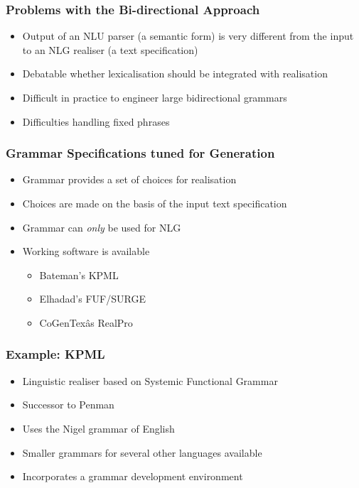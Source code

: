 \documentclass[compress,color=usenames]{beamer}
\begin{document}
\begin{frame}
\frametitle{
Problems with the 
Bi-directional Approach}

\label{f33}
\begin{itemize}
\item {{Output of an NLU parser (a semantic form) is very different from the input to an NLG realiser (a text specification)}}
\item {{Debatable whether lexicalisation should be integrated with realisation}}
\item {{Difficult in practice to engineer large bidirectional grammars}}
\item {{Difficulties handling fixed phrases}}
\end{itemize}

\end{frame}

\begin{frame}
\frametitle{
Grammar Specifications tuned for Generation}

\label{f35}
\begin{itemize}
\item {{Grammar provides a set of choices for realisation}}
\item {{Choices are made on the basis of the input text specification}}
\item {{Grammar can \textit{only} be used for NLG}}
\item {{Working software is available}}
\begin{itemize}
\item Bateman's KPML
\item Elhadad's FUF/SURGE
\item CoGenTex\^as RealPro
\end{itemize}
\end{itemize}
\end{frame}

\begin{frame}
\frametitle{
Example: KPML}

\label{f37}
\begin{itemize}
\item {{Linguistic realiser based on Systemic Functional Grammar}}
\item {{Successor to Penman}}
\item {{Uses the Nigel grammar of English}}
\item {{Smaller grammars for several other languages available}}
\item {{Incorporates a grammar development environment}}
\end{itemize}
 
\end{frame}
\end{document}
